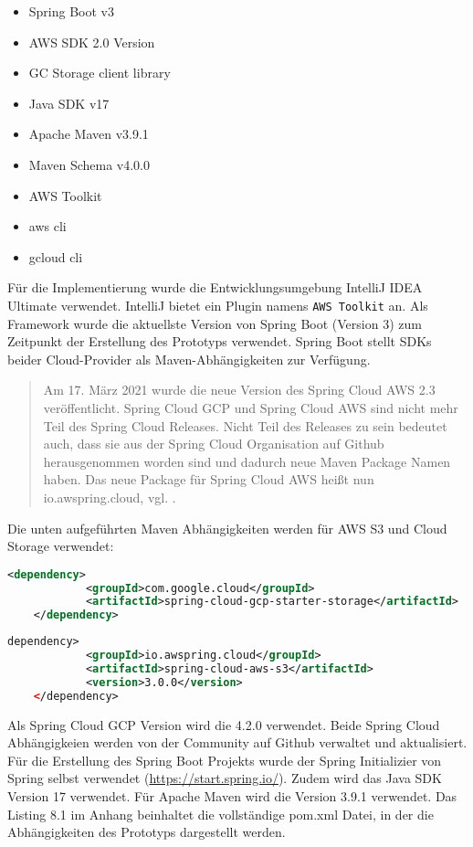 \begin{itemize}
	\item Spring Boot v3
	\item AWS SDK 2.0 Version
	\item GC Storage client library
	\item Java SDK v17
	\item Apache Maven v3.9.1
	\item Maven Schema v4.0.0
	\item AWS Toolkit
	\item aws cli
	\item gcloud cli
\end{itemize}

Für die Implementierung wurde die Entwicklungsumgebung IntelliJ IDEA Ultimate verwendet. IntelliJ bietet ein Plugin namens \verb|AWS Toolkit| an. Als Framework wurde die aktuellste Version von Spring Boot (Version 3) zum Zeitpunkt der Erstellung des Prototyps verwendet. Spring Boot stellt SDKs beider Cloud-Provider als Maven-Abhängigkeiten zur Verfügung.

\begin{quote}
	Am 17. März 2021 wurde die neue Version des Spring Cloud AWS 2.3 veröffentlicht. Spring Cloud GCP und Spring Cloud AWS sind nicht mehr Teil des Spring Cloud Releases. Nicht Teil des Releases zu sein bedeutet auch, dass sie aus der Spring Cloud Organisation auf Github herausgenommen worden sind und dadurch neue Maven Package Namen haben. Das neue Package für Spring Cloud AWS heißt nun \glqq io.awspring.cloud\grqq, vgl. \cite{spring-cloud}. 
\end{quote}

Die unten aufgeführten Maven Abhängigkeiten werden für AWS S3 und Cloud Storage verwendet:

\begin{lstlisting}[language=XML]
	<dependency>
        	<groupId>com.google.cloud</groupId>
        	<artifactId>spring-cloud-gcp-starter-storage</artifactId>
    </dependency>
\end{lstlisting}

\begin{lstlisting}[language=XML]
	dependency>
        	<groupId>io.awspring.cloud</groupId>
        	<artifactId>spring-cloud-aws-s3</artifactId>
        	<version>3.0.0</version>
    </dependency>
\end{lstlisting}

Als Spring Cloud GCP Version wird die 4.2.0 verwendet. Beide Spring Cloud Abhängigkeien werden von der Community auf Github verwaltet und aktualisiert. Für die Erstellung des Spring Boot Projekts wurde der Spring Initializier von Spring selbst verwendet (\url{https://start.spring.io/}). Zudem wird das Java SDK Version 17 verwendet. Für Apache Maven wird die Version 3.9.1 verwendet. Das Listing 8.1 im Anhang beinhaltet die vollständige pom.xml Datei, in der die Abhängigkeiten des Prototyps dargestellt werden.

